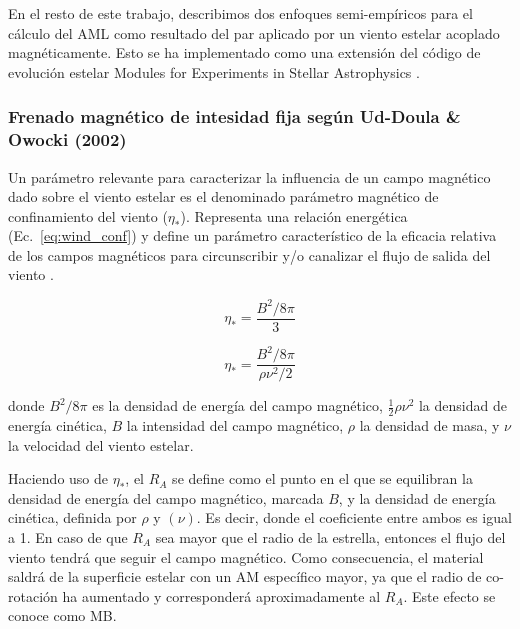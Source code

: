 En el resto de este trabajo, describimos dos enfoques semi-empíricos para el cálculo del AML como resultado del par aplicado por un viento estelar acoplado magnéticamente. Esto se ha implementado como una extensión del código de evolución estelar Modules for Experiments in Stellar Astrophysics \cite[MESA; ][]{Paxton2011, Paxton2013,Paxton2015, Paxton2018, Paxton2019}.

\subsubsection{Frenado magnético de intesidad fija según Ud-Doula \& Owocki (2002)}
Un parámetro relevante para caracterizar la influencia de un campo magnético dado sobre el viento estelar es el denominado parámetro magnético de confinamiento del viento ($\eta_*$). Representa una relación energética (Ec.~\ref{eq:wind_conf}) y define un parámetro característico de la eficacia relativa de los campos magnéticos para circunscribir y/o canalizar el flujo de salida del viento \cite{UdDoula2002}.\par

\begin{ceqn}
\begin{equation}
    \eta_* = \frac{B^{2}/8 \pi}{3} \label{eq:wind_conf2}
\end{equation}
\end{ceqn}


\begin{ceqn}
\begin{equation}
    \eta_* = \frac{B^{2}/8\pi}{\rho\nu^2/2} \label{eq:wind_conf}
\end{equation}
\end{ceqn}

donde $B^{2}/8\pi$ es la densidad de energía del campo magnético, $\frac{1}{2}\rho\nu^{2}$ la densidad de energía cinética, $B$ la intensidad del campo magnético, $\rho$ la densidad de masa, y $\nu$ la velocidad del viento estelar.\par

Haciendo uso de $\eta_*$, el $R_{A}$ se define como el punto en el que se equilibran la densidad de energía del campo magnético, marcada $B$, y la densidad de energía cinética, definida por $\rho$ y $(\nu)$. Es decir, donde el coeficiente entre ambos es igual a 1. En caso de que $R_{A}$ sea mayor que el radio de la estrella, entonces el flujo del viento tendrá que seguir el campo magnético. Como consecuencia, el material saldrá de la superficie estelar con un AM específico mayor, ya que el radio de co-rotación ha aumentado y corresponderá aproximadamente al $R_{A}$. Este efecto se conoce como MB.\par

